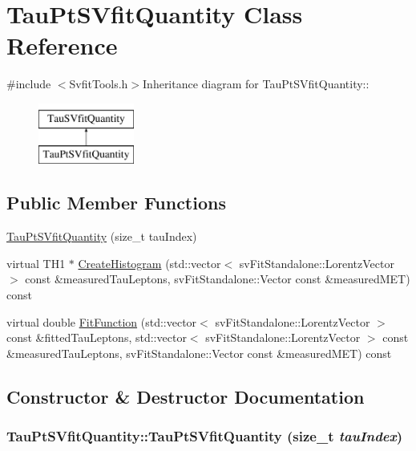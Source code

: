 \hypertarget{classTauPtSVfitQuantity}{
\section{TauPtSVfitQuantity Class Reference}
\label{classTauPtSVfitQuantity}
}


{\ttfamily \#include $<$SvfitTools.h$>$}Inheritance diagram for TauPtSVfitQuantity::\begin{figure}[H]
\begin{center}
\leavevmode
\includegraphics[height=2cm]{classTauPtSVfitQuantity}
\end{center}
\end{figure}
\subsection*{Public Member Functions}
\begin{DoxyCompactItemize}
\item 
\hyperlink{classTauPtSVfitQuantity_a5b12558476d0e44d8d329878d9c8d0b6}{TauPtSVfitQuantity} (size\_\-t tauIndex)
\item 
virtual TH1 $\ast$ \hyperlink{classTauPtSVfitQuantity_ad70e485e952a6f8e916d7d812b7e7ca1}{CreateHistogram} (std::vector$<$ svFitStandalone::LorentzVector $>$ const \&measuredTauLeptons, svFitStandalone::Vector const \&measuredMET) const 
\item 
virtual double \hyperlink{classTauPtSVfitQuantity_a5227419cdf4277840c130c2557067de2}{FitFunction} (std::vector$<$ svFitStandalone::LorentzVector $>$ const \&fittedTauLeptons, std::vector$<$ svFitStandalone::LorentzVector $>$ const \&measuredTauLeptons, svFitStandalone::Vector const \&measuredMET) const 
\end{DoxyCompactItemize}


\subsection{Constructor \& Destructor Documentation}
\hypertarget{classTauPtSVfitQuantity_a5b12558476d0e44d8d329878d9c8d0b6}{
\subsubsection[{TauPtSVfitQuantity}]{\setlength{\rightskip}{0pt plus 5cm}TauPtSVfitQuantity::TauPtSVfitQuantity (size\_\-t {\em tauIndex})}}
\label{classTauPtSVfitQuantity_a5b12558476d0e44d8d329878d9c8d0b6}


